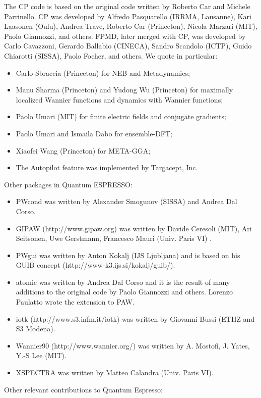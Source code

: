 \documentclass[12pt,a4paper]{article}
\begin{document}
The CP code is based on the original code written by Roberto Car and
Michele Parrinello. CP was developed by Alfredo Pasquarello (IRRMA, Lausanne),
Kari Laasonen (Oulu), Andrea Trave, Roberto Car (Princeton), 
Nicola Marzari (MIT), Paolo Giannozzi, and others.
FPMD, later merged with CP, was developed by Carlo Cavazzoni, 
Gerardo Ballabio (CINECA), Sandro Scandolo (ICTP), 
Guido Chiarotti (SISSA), Paolo Focher, and others.
We quote in particular:
\begin{itemize}
  \item Carlo Sbraccia (Princeton) for NEB and Metadynamics;
  \item Manu Sharma (Princeton) and Yudong Wu (Princeton) for maximally 
localized Wannier functions and dynamics with Wannier functions;
  \item Paolo Umari (MIT) for finite electric fields and conjugate gradients;
  \item Paolo Umari and Ismaila Dabo for ensemble-DFT;
  \item Xiaofei Wang (Princeton) for META-GGA;
  \item The Autopilot feature was implemented by Targacept, Inc.
\end{itemize}
Other packages in Quantum ESPRESSO:
\begin{itemize}
\item
PWcond was written by Alexander Smogunov (SISSA) and Andrea Dal Corso.
\item
GIPAW (http://www.gipaw.org) was written by Davide Ceresoli
(MIT), Ari Seitsonen, Uwe Gerstmann,  Francesco Mauri (Univ.
Paris VI) .
\item
PWgui was written by Anton Kokalj (IJS Ljubljana) and is based on his
GUIB concept (http://www-k3.ijs.si/kokalj/guib/).
\item
atomic was written by Andrea Dal Corso and it is the result 
of many additions to the original code by Paolo Giannozzi 
and others. Lorenzo Paulatto wrote the extension to PAW.
\item
iotk (http://www.s3.infm.it/iotk) was written by Giovanni Bussi 
(ETHZ and S3 Modena).
\item
Wannier90 (http://www.wannier.org/) was written by A. Mostofi, J. Yates, 
Y.-S Lee (MIT).
\item
XSPECTRA was written by Matteo Calandra (Univ. Paris VI).
\end{itemize}
Other relevant contributions to Quantum Espresso:
\end{document}
